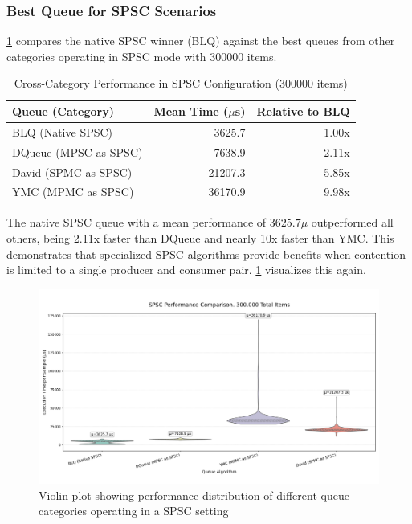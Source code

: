 \subsubsection{Best Queue for \ac{SPSC} Scenarios}
\cref{tab:best-spsc} compares the native \ac{SPSC} winner (\ac{BLQ}) against the best queues from other categories operating in \ac{SPSC} mode with 300000 items.

\begin{table}[htb]
\centering
\caption{Cross-Category Performance in \ac{SPSC} Configuration (300000 items)}
\label{tab:best-spsc}
\begin{tabular}{@{}lrr@{}}
\toprule
Queue (Category) & Mean Time ($\mu$s) & Relative to \ac{BLQ} \\
\midrule
\ac{BLQ} (Native SPSC) & 3625.7 & 1.00x \\
DQueue (MPSC as SPSC) & 7638.9 & 2.11x \\
David (SPMC as SPSC) & 21207.3 & 5.85x \\
\ac{YMC} (MPMC as SPSC) & 36170.9 & 9.98x \\
\bottomrule
\end{tabular}
\end{table}

The native \ac{SPSC} queue with a mean performance of $3625.7\mu$ outperformed all others, being 2.11x faster than DQueue and nearly 10x faster than \ac{YMC}. This demonstrates that specialized \ac{SPSC} algorithms provide benefits when contention is limited to a single producer and consumer pair. \cref{fig:cross-spsc-violin} visualizes this again.

\begin{figure}[htb]
\centering
\caption{Violin plot showing performance distribution of different queue categories operating in a \ac{SPSC} setting}
\label{fig:cross-spsc-violin}
\includegraphics[width=\textwidth]{images/results/best_algorithms_in_spsc_performance.png}
\end{figure}

